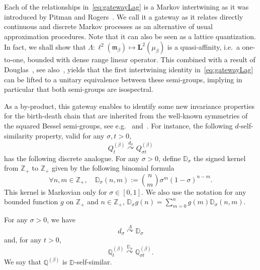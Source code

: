 \documentclass[10pt]{amsart}
\theoremstyle{definition}\newtheorem{defi}[theo]{Definition}\newtheorem{rema}[theo]{Remark}\newtheorem{exam}[theo]{Example}\newtheorem{exem}[theo]{Example}\newtheorem{nota}[theo]{Notation}
\newcommand{\df}{\mathrel{:=}}
\newcommand{\ZZ}{\mathbb{Z}}
\newcommand{\fm}{\mathfrak{m}}
\newcommand{\esL}{\mathbf{L}}
\newcommand{\discret}[1]{\mathds{#1}}
\newcommand{\cont}[1]{{#1}}
\newcommand{\Gate}[3]{#1\stackrel{#2}{\curvearrowright}#3}
\let\oldforall\forall
\renewcommand*{\forall}{\mathrel{\oldforall}}
\begin{document}
Each of the relationships in~\eqref{eq:gatewayLag} is a Markov intertwining as it was introduced by Pitman and Rogers~\cite{Pitman1981}. We call it a gateway as it relates directly continuous and discrete Markov processes as an alternative of usual approximation procedures. Note that it can also be seen as a lattice quantization. In fact, we shall show that $\Lambda : \ell^2({\fm_{\beta}}) \mapsto \esL^2(\mu_{\beta})$ is a quasi-affinity, i.e.~a one-to-one, bounded with dense range linear operator. This combined with a result of Douglas~\cite{Douglas}, see also~\cite[Proposition~3.H]{SpectralBook}, yields that the first intertwining identity in~\eqref{eq:gatewayLag} can be lifted to a unitary equivalence between these semi-groups, implying in particular that both semi-groups are isospectral.

As a by-product, this gateway enables to identify some new invariance properties for the birth-death chain that are inherited from the well-known symmetries of the squared Bessel semi-groups, see e.g.~\cite{Pitman1981b} and~\cite{Going-Yor-99}. For instance, the following $\cont{d}$-self-similarity property, valid for any $\sigma,t>0$,
\begin{equation}\label{eq:self-bessel}
\Gate{\cont{Q}^{(\beta)}_{t}}{\cont{d}_\sigma}{\cont{Q}^{(\beta)}_{\sigma t}}
\end{equation}
has the following discrete analogue. For any $\sigma>0$, define $\discret{D}_\sigma$ the signed kernel from $\ZZ_+$ to $\ZZ_+$ given by the following binomial formula
\[
\forall n,m\in\ZZ_+,\quad \discret{D}_\sigma(n,m)\df\binom{n}{m}\sigma^m(1-\sigma)^{n-m}.
\]
This kernel is Markovian only for $\sigma\in[0,1]$. We also use the notation for any bounded function $g$ on $\ZZ_+$ and $n\in \ZZ_+$, $
\discret{D}_\sigma g(n)=\sum_{m=0}^n g(m)\discret{D}_\sigma (n,m)$.

\begin{prop}\label{prop:self}
\label{prop:comut-Dd}
For any $\sigma>0$, we have
\begin{equation}\label{eq:dil-D}
\Gate{\cont{d}_\sigma}{\Lambda}{\discret{D}_\sigma}
\end{equation}
and, for any $t>0$,
\begin{equation}\label{eq:self-besseld}
\Gate{\discret{Q}^{(\beta)}_{t}}{\discret{D}_\sigma}{\discret{Q}^{(\beta)}_{\sigma t}}.
\end{equation}
We say that $\discret{Q}^{(\beta)}$ is $\discret{D}$-self-similar.
\end{prop}
\end{document}
